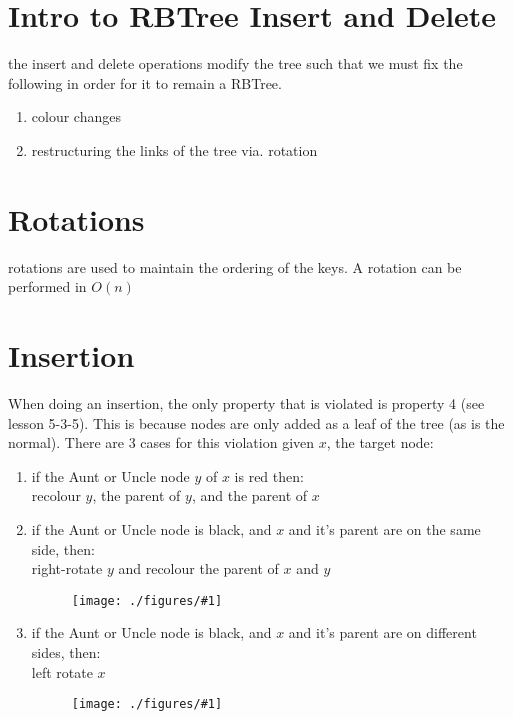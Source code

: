 \documentclass[12pt]{book}
\title{\coursetitle\linebreak\lecturename}
\author{\\Cain Susko\\ 
           \\ \\ \\
      Queen's University 
    \\School of Computing\\}
\newcommand{\incimg}[2]{%
       \begin{figure}[h]
               \centering
               \texttt{[image: ./figures/\#1]}
       \end{figure}
}
\begin{document}
\begin{titlepage}
        \maketitle
\end{titlepage}


\section*{Intro to RBTree Insert and Delete}
the insert and delete operations modify the tree such that we must fix the following in
order for it to remain a RBTree.
\begin{enumerate}
        \item colour changes
        \item restructuring the links of the tree via. rotation
\end{enumerate}

\section*{Rotations}
rotations are used to maintain the ordering of the keys. A rotation can be performed in $O(n)$

\section*{Insertion}
When doing an insertion, the only property that is violated is property 4 (see lesson 5-3-5).
This is because nodes are only added as a leaf of the tree (as is the normal).
There are 3 cases for this violation given $x$, the target node:
\begin{enumerate}
        \item if the Aunt or Uncle node $y$ of $x$ is red then:\\
                recolour $y$, the parent of $y$, and the parent of $x$
        \item if the Aunt or Uncle node is black, and $x$ and it's parent are on the same
          side, then:\\
                right-rotate $y$ and recolour the parent of $x$ and $y$
                \incimg{yBlack}{0.5}
        \pagebreak

        \item if the Aunt or Uncle node is black, and $x$ and it's parent are on different sides,
        then:\\
               left rotate $x$ 
               \incimg{case3}{0.5}
\end{enumerate}
\end{document}
